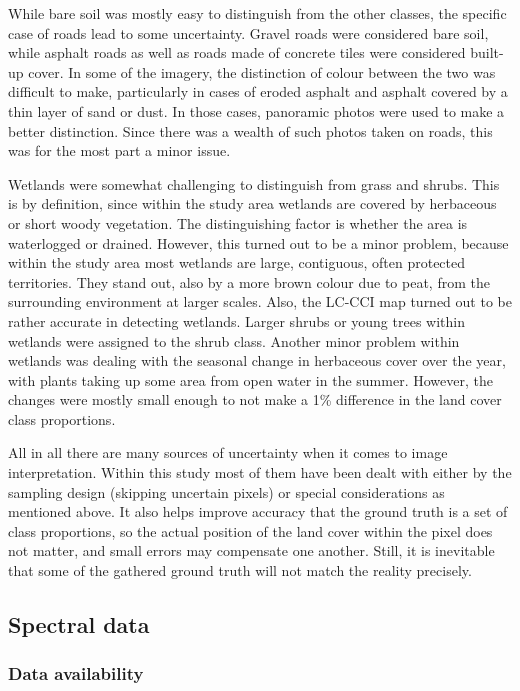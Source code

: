 \documentclass[a4paper,10pt]{book}
\begin{document}
While bare soil was mostly easy to distinguish from the other classes, the specific case of roads lead to some uncertainty. Gravel roads were considered bare soil, while asphalt roads as well as roads made of concrete tiles were considered built-up cover. In some of the imagery, the distinction of colour between the two was difficult to make, particularly in cases of eroded asphalt and asphalt covered by a thin layer of sand or dust. In those cases, panoramic photos were used to make a better distinction. Since there was a wealth of such photos taken on roads, this was for the most part a minor issue.

Wetlands were somewhat challenging to distinguish from grass and shrubs. This is by definition, since within the study area wetlands are covered by herbaceous or short woody vegetation. The distinguishing factor is whether the area is waterlogged or drained. However, this turned out to be a minor problem, because within the study area most wetlands are large, contiguous, often protected territories. They stand out, also by a more brown colour due to peat, from the surrounding environment at larger scales. Also, the LC-CCI map turned out to be rather accurate in detecting wetlands. Larger shrubs or young trees within wetlands were assigned to the shrub class. Another minor problem within wetlands was dealing with the seasonal change in herbaceous cover over the year, with plants taking up some area from open water in the summer. However, the changes were mostly small enough to not make a 1\% difference in the land cover class proportions.

All in all there are many sources of uncertainty when it comes to image interpretation. Within this study most of them have been dealt with either by the sampling design (skipping uncertain pixels) or special considerations as mentioned above. It also helps improve accuracy that the ground truth is a set of class proportions, so the actual position of the land cover within the pixel does not matter, and small errors may compensate one another. Still, it is inevitable that some of the gathered ground truth will not match the reality precisely.

\subsection{Spectral data}
\label{sec-spectral}

\subsubsection{Data availability}
\end{document}
